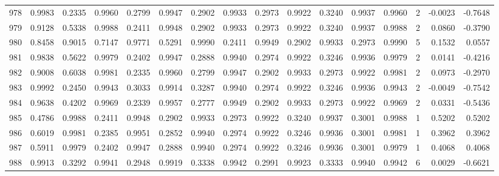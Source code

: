 \begin{tabular}{lrrrrrrrrrrrrrrr}
978 &      0.9983 &  0.2335 &  0.9960 &  0.2799 &  0.9947 &  0.2902 &  0.9933 &  0.2973 &  0.9922 &  0.3240 &   0.9937 &     0.9960 &      2 &                   -0.0023 &                    -0.7648 \\
979 &      0.9128 &  0.5338 &  0.9988 &  0.2411 &  0.9948 &  0.2902 &  0.9933 &  0.2973 &  0.9922 &  0.3240 &   0.9937 &     0.9988 &      2 &                    0.0860 &                    -0.3790 \\
980 &      0.8458 &  0.9015 &  0.7147 &  0.9771 &  0.5291 &  0.9990 &  0.2411 &  0.9949 &  0.2902 &  0.9933 &   0.2973 &     0.9990 &      5 &                    0.1532 &                     0.0557 \\
981 &      0.9838 &  0.5622 &  0.9979 &  0.2402 &  0.9947 &  0.2888 &  0.9940 &  0.2974 &  0.9922 &  0.3246 &   0.9936 &     0.9979 &      2 &                    0.0141 &                    -0.4216 \\
982 &      0.9008 &  0.6038 &  0.9981 &  0.2335 &  0.9960 &  0.2799 &  0.9947 &  0.2902 &  0.9933 &  0.2973 &   0.9922 &     0.9981 &      2 &                    0.0973 &                    -0.2970 \\
983 &      0.9992 &  0.2450 &  0.9943 &  0.3033 &  0.9914 &  0.3287 &  0.9940 &  0.2974 &  0.9922 &  0.3246 &   0.9936 &     0.9943 &      2 &                   -0.0049 &                    -0.7542 \\
984 &      0.9638 &  0.4202 &  0.9969 &  0.2339 &  0.9957 &  0.2777 &  0.9949 &  0.2902 &  0.9933 &  0.2973 &   0.9922 &     0.9969 &      2 &                    0.0331 &                    -0.5436 \\
985 &      0.4786 &  0.9988 &  0.2411 &  0.9948 &  0.2902 &  0.9933 &  0.2973 &  0.9922 &  0.3240 &  0.9937 &   0.3001 &     0.9988 &      1 &                    0.5202 &                     0.5202 \\
986 &      0.6019 &  0.9981 &  0.2385 &  0.9951 &  0.2852 &  0.9940 &  0.2974 &  0.9922 &  0.3246 &  0.9936 &   0.3001 &     0.9981 &      1 &                    0.3962 &                     0.3962 \\
987 &      0.5911 &  0.9979 &  0.2402 &  0.9947 &  0.2888 &  0.9940 &  0.2974 &  0.9922 &  0.3246 &  0.9936 &   0.3001 &     0.9979 &      1 &                    0.4068 &                     0.4068 \\
988 &      0.9913 &  0.3292 &  0.9941 &  0.2948 &  0.9919 &  0.3338 &  0.9942 &  0.2991 &  0.9923 &  0.3333 &   0.9940 &     0.9942 &      6 &                    0.0029 &                    -0.6621 \\

\end{tabular}
